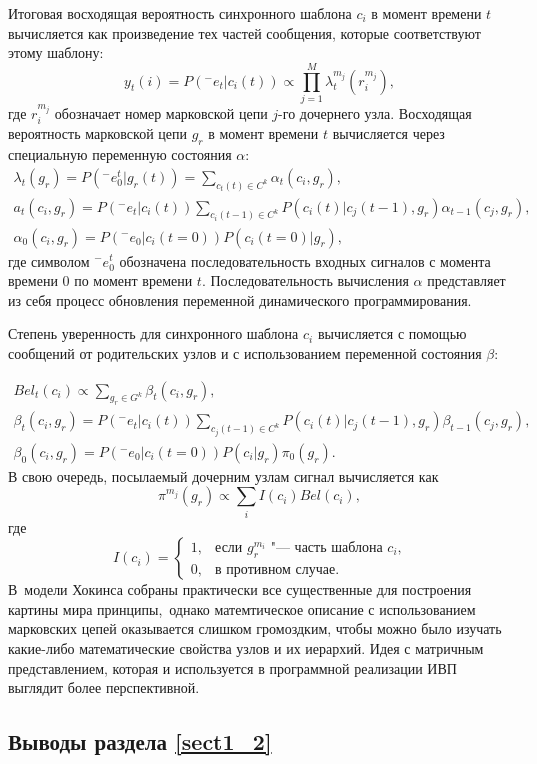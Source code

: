Итоговая восходящая вероятность синхронного шаблона $c_i$ в момент времени $t$ вычисляется как произведение тех частей сообщения, которые соответствуют этому шаблону:
\[
	y_t(i)=P({}^-e_t|c_i(t))\varpropto\prod_{j=1}^{M}\lambda_t^{m_j}(r_i^{m_j}),
\]
где $r_i^{m_j}$ обозначает номер марковской цепи $j$-го дочернего узла. Восходящая вероятность марковской цепи $g_r$ в момент времени $t$ вычисляется через специальную переменную состояния $\alpha$:
\[
	\begin{split}
	\lambda_t(g_r)=P({}^-e_0^t|g_r(t)) = \sum_{c_t(t)\in C^k}\alpha_t(c_i, g_r),\\
	a_t(c_i,g_r )=P({}^-e_t|c_i(t))\sum_{c_i(t-1)\in C^k}P(c_i(t)|c_j(t-1),g_r)\alpha_{t-1}(c_j,g_r),\\
	\alpha_0(c_i,g_r)=P({}^-e_0|c_i(t=0))P(c_i(t=0)|g_r),
	\end{split}
\]
где символом ${}^-e_0^t$ обозначена последовательность входных сигналов с момента времени $0$ по момент времени $t$. Последовательность вычисления $\alpha$ представляет из себя процесс обновления переменной динамического программирования.

Степень уверенность для синхронного шаблона $c_i$ вычисляется с помощью сообщений от родительских узлов и с использованием переменной состояния $\beta$:

\[
	\begin{split}
		Bel_t(c_i)\varpropto\sum_{g_r\in G^k}\beta_t(c_i,g_r),\\
		\beta_t(c_i,g_r)=P({}^-e_t|c_i(t))\sum_{c_j(t-1)\in C^k}P(c_i(t)|c_j(t-1),g_r)\beta_{t-1}(c_j,g_r),\\
		\beta_0(c_i,g_r)=P({}^-e_0|c_i(t=0))P(c_i|g_r)\pi_0(g_r).
	\end{split}
\]
В свою очередь, посылаемый дочерним узлам сигнал вычисляется как
\[
	\pi^{m_j}(g_r)\varpropto\sum_i I(c_i)Bel(c_i),
\]
где
\[
	I(c_i)=
	\begin{cases}
		1, & \text{если $g_r^{m_i}$ "--- часть шаблона $c_i$,}\\
		0, & \text{в противном случае.}
	\end{cases}
\]
В~модели Хокинса собраны практически все существенные для построения картины мира принципы,~однако матемтическое описание с использованием марковских цепей оказывается слишком громоздким, чтобы можно было изучать какие-либо математические свойства узлов и их иерархий. Идея с матричным представлением, которая и используется в программной реализации ИВП выглядит более перспективной.

\subsection{Выводы раздела \ref{sect1_2}}

